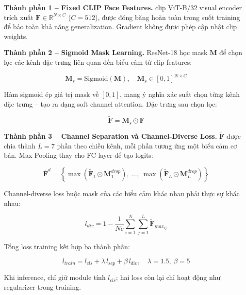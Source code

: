 \documentclass[12pt,a4paper]{article}
\let\oldtextbf\textbf
\renewcommand{\textbf}[1]{\oldtextbf{\textcolor{hcmublue}{#1}}}
\begin{document}
\textbf{Thành phần 1 -- Fixed CLIP Face Features.}
\gls{clip} ViT-B/32 visual encoder trích xuất $\mathbf{F} \in \mathbb{R}^{N \times C}$ ($C = 512$), được đóng băng hoàn toàn trong suốt training để bảo toàn khả năng generalization. Gradient không được phép cập nhật \gls{clip} weights.

\textbf{Thành phần 2 -- Sigmoid Mask Learning.}
ResNet-18 học mask $\mathbf{M}$ để chọn lọc các kênh đặc trưng liên quan đến biểu cảm từ \gls{clip} features:

\begin{equation}
    \mathbf{M}_s = \text{Sigmoid}(\mathbf{M}), \quad \mathbf{M}_s \in [0,1]^{N \times C}
    \label{eq:sigmoid_mask}
\end{equation}

Hàm sigmoid ép giá trị mask về $[0, 1]$, mang ý nghĩa xác suất chọn từng kênh đặc trưng -- tạo ra dạng soft channel attention. Đặc trưng sau chọn lọc:

\begin{equation}
    \tilde{\mathbf{F}} = \mathbf{M}_s \odot \mathbf{F}
    \label{eq:masked_feature}
\end{equation}

\textbf{Thành phần 3 -- Channel Separation và Channel-Diverse Loss.}
$\tilde{\mathbf{F}}$ được chia thành $L=7$ phần theo chiều kênh, mỗi phần tương ứng một biểu cảm cơ bản. Max Pooling thay cho FC layer để tạo logits:

\begin{equation}
    \bar{\mathbf{F}}^d = \left\{\max(\tilde{\mathbf{F}}_1 \odot \mathbf{M}^{drop}_1),\ \ldots,\ \max(\tilde{\mathbf{F}}_L \odot \mathbf{M}^{drop}_L)\right\}
    \label{eq:channel_sep}
\end{equation}

Channel-diverse loss buộc mask của các biểu cảm khác nhau phải thực sự khác nhau:

\begin{equation}
    l_{div} = 1 - \frac{1}{Nc} \sum_{i=1}^{N} \sum_{j=1}^{L} \tilde{\mathbf{F}}_{max_{ij}}
    \label{eq:div_loss}
\end{equation}

Tổng loss training kết hợp ba thành phần:

\begin{equation}
    l_{train} = l_{cls} + \lambda\, l_{sep} + \beta\, l_{div}, \quad \lambda=1.5,\ \beta=5
    \label{eq:total_loss}
\end{equation}

Khi inference, chỉ giữ module tính $l_{cls}$; hai loss còn lại chỉ hoạt động như regularizer trong training.
\end{document}
